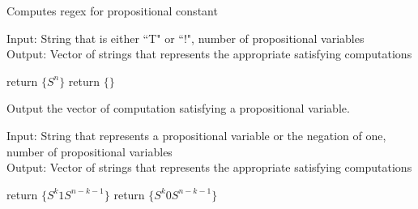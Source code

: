\documentclass[runningheads]{llncs}
\begin{document}
\begin{algorithm}[H]
\caption{Computes regex for propositional constant}
Input: String that is either ``T" or ``!", number of propositional variables\\
Output: Vector of strings that represents the appropriate satisfying computations
\begin{algorithmic}
        \State return $\{S^n\}$ 
    \Else 
        \State return $\{\}$ 
    \EndIf
\EndProcedure

\end{algorithmic}
\end{algorithm}



\begin{algorithm}[H]
\caption{Output the vector of computation satisfying a propositional variable.}
Input: String that represents a propositional variable or the negation of one, number of propositional variables \\
Output: Vector of strings that represents the appropriate satisfying computations
\begin{algorithmic}

        \State return $\{S^k1S^{n-k-1}\}$ 
    \EndIf 
        \State return $\{S^k0S^{n-k-1}\}$ 
    \EndIf
\EndProcedure

\end{algorithmic}
\end{algorithm}
\end{document}
